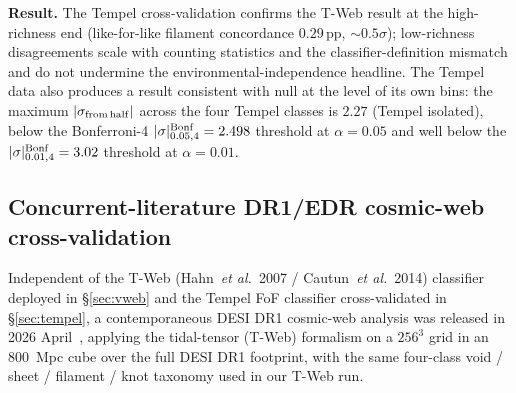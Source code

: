 \documentclass[aps,prd,twocolumn,superscriptaddress,showpacs,preprintnumbers,nofootinbib,longbibliography,floatfix]{revtex4-2}
\begin{document}
\textbf{Result.} The Tempel cross-validation confirms the T-Web
result at the high-richness end (like-for-like filament concordance
$0.29$\,pp, ${\sim}0.5\sigma$);
low-richness disagreements scale with counting statistics and the
classifier-definition mismatch and do not undermine the
environmental-independence headline. The Tempel data also produces a
result consistent with null at the level of its own bins: the maximum
$|\sigma_{\rm from\,half}|$ across the four Tempel classes is
$2.27$ (Tempel isolated), below the Bonferroni-4
$|\sigma|^{\rm Bonf}_{0.05,4}=2.498$ threshold at $\alpha = 0.05$ and
well below the
$|\sigma|^{\rm Bonf}_{0.01,4}=3.02$ threshold at $\alpha = 0.01$.

\subsection{Concurrent-literature DR1/EDR cosmic-web
cross-validation}\label{sec:tweb_concurrent}

Independent of the T-Web (Hahn~\textit{et al.}~2007 / Cautun~\textit{et
al.}~2014) classifier deployed in \S\ref{sec:vweb} and the Tempel FoF
classifier cross-validated in \S\ref{sec:tempel}, a contemporaneous
DESI DR1 cosmic-web analysis was released in 2026
April~\cite{TWebDESI2026}, applying the tidal-tensor (T-Web) formalism
on a $256^{3}$ grid in an $800$~Mpc cube over the full DESI DR1
footprint, with the same four-class void / sheet / filament / knot
taxonomy used in our T-Web run.
\end{document}

